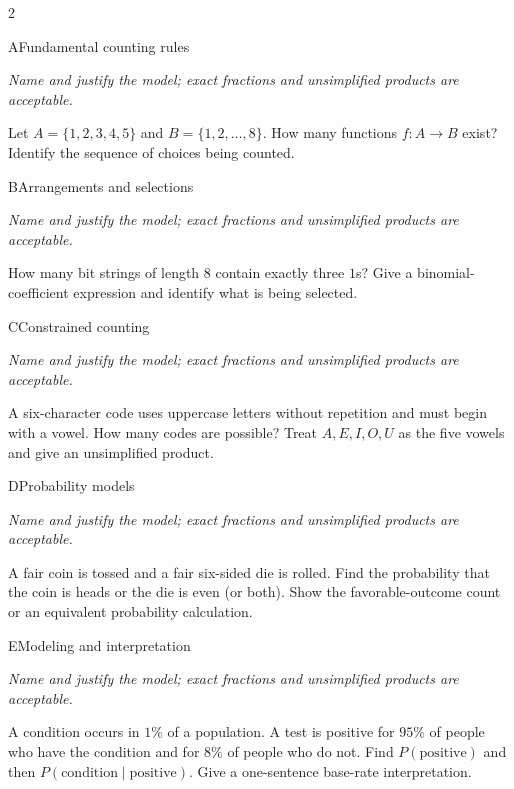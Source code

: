 \documentclass[9pt]{extarticle}
\begin{document}
\begin{multicols}{2}
\begin{CoreProblem}{A}{Fundamental counting rules}
{\scriptsize\textit{Name and justify the model; exact fractions and unsimplified products are acceptable.}\par}
Let $A=\{1,2,3,4,5\}$ and $B=\{1,2,\ldots,8\}$. How many functions
    $f:A\to B$ exist? Identify the sequence of choices being counted.
\end{CoreProblem}
\begin{CoreProblem}{B}{Arrangements and selections}
{\scriptsize\textit{Name and justify the model; exact fractions and unsimplified products are acceptable.}\par}
How many bit strings of length 8 contain exactly three $1$s? Give a
    binomial-coefficient expression and identify what is being selected.
\end{CoreProblem}
\begin{CoreProblem}{C}{Constrained counting}
{\scriptsize\textit{Name and justify the model; exact fractions and unsimplified products are acceptable.}\par}
A six-character code uses uppercase letters without repetition and
    must begin with a vowel. How many codes are possible? Treat
    $A,E,I,O,U$ as the five vowels and give an unsimplified product.
\end{CoreProblem}
\columnbreak
\begin{CoreProblem}{D}{Probability models}
{\scriptsize\textit{Name and justify the model; exact fractions and unsimplified products are acceptable.}\par}
A fair coin is tossed and a fair six-sided die is rolled. Find the
    probability that the coin is heads or the die is even (or both). Show the
    favorable-outcome count or an equivalent probability calculation.
\end{CoreProblem}
\begin{CoreProblem}{E}{Modeling and interpretation}
{\scriptsize\textit{Name and justify the model; exact fractions and unsimplified products are acceptable.}\par}
A condition occurs in $1\%$ of a population. A test is positive for
    $95\%$ of people who have the condition and for $8\%$ of people who do not.
    Find $P(\text{positive})$ and then
    $P(\text{condition}\mid\text{positive})$. Give a one-sentence base-rate
    interpretation.
\end{CoreProblem}
\end{multicols}
\CoreWorkArea
\end{document}
